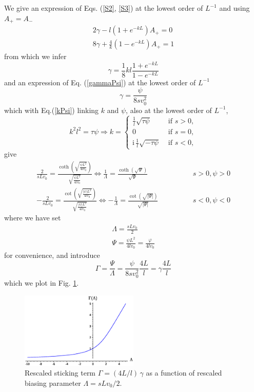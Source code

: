 \documentclass[pre,aps,superscriptaddress,nofootinbib]{revtex4}
\begin{document}
We give an expression of Eqs. (\ref{S2}, \ref{S3}) at the lowest order of $L^{-1}$ and using $A_+ = A_-$
\begin{eqnarray}
\label{SC1}
2 \gamma - l(1 + e^{-kL}) A_+ = 0\\
\label{SC2}
8 \gamma + \frac{4}{k} (1 - e^{-kL}) A_+ = 1
\end{eqnarray}
from which we infer
\begin{equation}
\label{SCgamma}
\gamma = \frac{1}{8} k l \frac{1 + e^{-kL}}{1 - e^{-kL}}
\end{equation}
and an expression of Eq. (\ref{gammaPsi}) at the lowest order of $L^{-1}$
\begin{equation}
\gamma = \frac{\psi}{8 s v_0^2}
\end{equation}
which with Eq.(\ref{kPsi}) linking $k$ and $\psi$, also at the lowest order of $L^{-1}$,
\begin{equation}
\label{SCkl}
k^2 l^2 = \tau \psi \Rightarrow k = \begin{cases} \frac{1}{l} \sqrt{\tau\psi} &\text{ if } s > 0, \\ 0 &\text{ if } s = 0, \\ \mathrm{i} \, \frac{1}{l} \sqrt{- \tau\psi} &\text{ if } s < 0, \end{cases}
\end{equation}
give
\begin{eqnarray}
\frac{2}{s L v_0} = \frac{\coth\left(\sqrt{\frac{\psi L^2}{4 l v_0}}\right)}{\sqrt{\frac{\psi L^2}{4 l v_0}}} \Leftrightarrow \frac{1}{\Lambda} = \frac{\coth\left(\sqrt{\Psi}\right)}{\sqrt{\Psi}} &\qquad\qquad s > 0, \psi > 0\\
- \frac{2}{s L v_0} = \frac{\cot\left(\sqrt{\frac{|\psi| L^2}{4 l v_0}}\right)}{\sqrt{\frac{|\psi| L^2}{4 l v_0}}} \Leftrightarrow - \frac{1}{\Lambda} = \frac{\cot\left(\sqrt{|\Psi|}\right)}{\sqrt{|\Psi|}} &\qquad\qquad s < 0, \psi < 0
\end{eqnarray}
where we have set
\begin{eqnarray}
\label{Lambda}
\Lambda = \frac{s L v_0}{2}\\
\label{Phi}
\Psi = \frac{\psi L^2}{4 l v_0} = \frac{\varphi}{4 l v_0}
\end{eqnarray}
for convenience, and introduce
\begin{equation}
\Gamma = \frac{\Psi}{\Lambda} = \frac{\psi}{8 s v_0^2} \frac{4 L}{l} = \gamma \frac{4 L}{l}
\label{eqGamma}
\end{equation}
which we plot in Fig. \ref{Gamma}.

\begin{figure}[H]
\centering
\includegraphics[width=0.5\textwidth]{gamma.eps}
\caption{Rescaled sticking term $\Gamma = (4L/l) \, \gamma$ as a function of rescaled biasing parameter $\Lambda = s L v_0/2$.}
\label{Gamma}
\end{figure}
\end{document}
